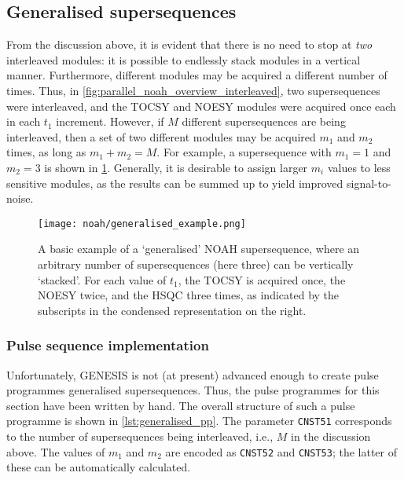 \subsection{Generalised supersequences}
\label{sec:noah__parallel_generalised}

From the discussion above, it is evident that there is no need to stop at \textit{two} interleaved modules: it is possible to endlessly stack modules in a vertical manner.
Furthermore, different modules may be acquired a different number of times.
Thus, in \cref{fig:parallel_noah_overview_interleaved}, two supersequences were interleaved, and the TOCSY and NOESY modules were acquired once each in each $t_1$ increment.
However, if $M$ different supersequences are being interleaved, then a set of two different modules may be acquired $m_1$ and $m_2$ times, as long as $m_1 + m_2 = M$.
For example, a supersequence with $m_1 = 1$ and $m_2 = 3$ is shown in \cref{fig:generalised_example}.
Generally, it is desirable to assign larger $m_i$ values to less sensitive modules, as the results can be summed up to yield improved signal-to-noise.

\begin{figure}[!ht]
    \centering
    \texttt{[image: noah/generalised\_example.png]}%
    \caption[A basic example of a generalised supersequence]{
        A basic example of a `generalised' NOAH supersequence, where an arbitrary number of supersequences (here three) can be vertically `stacked'.
        For each value of $t_1$, the TOCSY is acquired once, the NOESY twice, and the HSQC three times, as indicated by the subscripts in the condensed representation on the right.
    }
    \label{fig:generalised_example}
\end{figure}

\subsubsection{Pulse sequence implementation}

Unfortunately, GENESIS is not (at present) advanced enough to create pulse programmes generalised supersequences.
Thus, the pulse programmes for this section have been written by hand.
The overall structure of such a pulse programme is shown in \cref{lst:generalised_pp}.
The parameter \texttt{CNST51} corresponds to the number of supersequences being interleaved, i.e., $M$ in the discussion above.
The values of $m_1$ and $m_2$ are encoded as \texttt{CNST52} and \texttt{CNST53}; the latter of these can be automatically calculated.

